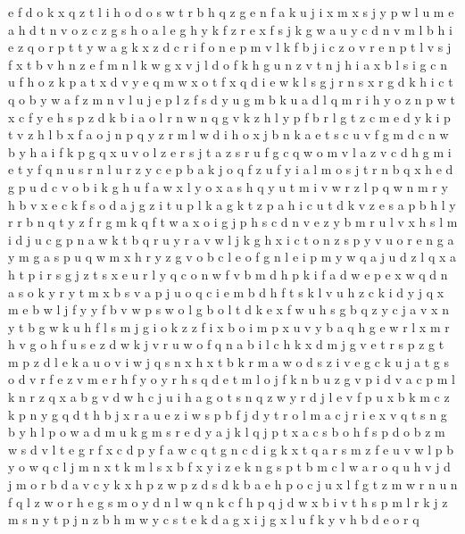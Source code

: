 \documentclass{article}
\begin{document}
e f d o
k x q z t l i h o
d o s w t r b h q z g e n f a k u j i x m
x s j y p w l u m e a h d t n v o z c
z g s h o
a l e g h y k f z r
e
x f s j k g w a u y c d n v m l b h i e z q o r p t
t y w a g k x z d c r i f o n e p m v l
k f b j i c z o v r e n p
t
l v s j f
x t b v h n z e f
m n
l k w g x v j
l d o f k h g u n z v t
n j h i a x
b l s i g c n u f h o z k p a t x d v y e q m w
x o t
f x q d i e w k l s g j r n
s x r g d k h i c t q o b y w a f z m n v l u j e p
l z f s d y u g m b
k u a d l q m r i h y o z n p w t x
c f y e h s p z d k b i a o l r n
w n q g v k z h l y p f b
r l g t z
c m e d y k i p t v z h l b x f a o j n
p q y z r m l w d i h o x j b n k a e t s c u v f g
m d c n w b y h a i f k p g q x u v o l z e r s
j t a z s r u f g c q w o m v l
a z v c d h g m i e t y f q n u s r
n l u r z y c e p b a k j o q f
z u f y i a l m o s j t r n b q x h e d g p
u d
c v o b i k g h u f a w x l y
o x a s h q y u t m i v w r z l p
q w n m r y h b v x e c k f s o d a j g z i t u p l
k a
g k t z p a h i c
u t d k v z e s a p b h l y r
r b n q t y z
f r g m
k q f t w a x o i g j p h s c d n v e z y b m r u l
v x h s l m i d j u c g p n a w k t b q r
u y r a v w l j k g h x i c t o n z
s p y v u o r e n g a
y m g a
s p u q w m x h r y z g v o b c l e
o f g n l e i p m y w q a j u
d z l q x a h t p i r s
g j z t s x e u r l y q c o n w f v b m d h p k i
f a d w e p
e x w q d n a s o k y
r y t m x b s v a p j u o q c i
e m b d h f t s k
l v u h z c k i d y j
q x m
e b w l j
f y
y f b v w
p s w o l g b
o l t d k e x f w u h s g b q z y c j a v
x n y t b g w k u h f l
s m j g i o k z
z f i x b
o i m p x u v y b a q h g e w r l
x m r h v
g o h f u s e z d w k j v r
u w o f q n a b i l c h k x d m j g v e t r s p z
g t m p z d l e k a u o v i w j q s n x
h x t b k r m a w o d s z i v e g c
k u j
a t g s o d v r f e z
v m e r h f
y o
y r h s q d e t m l o j f k n b u z g v p i
d v a c
p m l k n r z q x a b g v d w h c j u
i h a g o t s n q z w y r d j l e v f p u x b k m
c z k p n y g q d t h b j x r a u e
z i w s p b f j d y t r o l m a
c j r i e x v q t s n g b y h l p o w a d m u k
g m s r e d y a j k l
q j p t x a c s b o
h f s p d
o b z m w s d v l t e g r f x
c d p y f a
w c q t g
n c d i g k x t q a r s m z f e u v w l p b y o
w q
c l j m n x t
k m l s x b
f x y i z e k n g s p t b m c l w a r o q u h v j d
j m o r b d a v c y k x h p z w
p z d
s d k b a e h p o c j u x l f g t z m w r n
u n f q l z w o r h e g s m
o y d n l w q
n k c f h p
q j d w x b i v t h s p m l r k
j z m s n y t p
j n z b h m w y c s t e k d a g x
i j g x l u f k y v h b d e o r q
\end{document}
